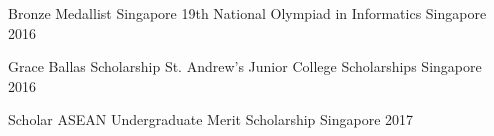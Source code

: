 



\begin{cvhonors}  
  \cvhonor
    {Bronze Medallist} %
    {Singapore 19th National Olympiad in Informatics} %
    {Singapore} %
    {2016} %
    
  \cvhonor
	{Grace Ballas Scholarship} %
	{St. Andrew's Junior College Scholarships} %
	{Singapore} %
	{2016} %
    
 \cvhonor
    {Scholar} %
    {ASEAN Undergraduate Merit Scholarship} %
    {Singapore} %
    {2017} %

\end{cvhonors}
